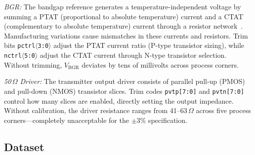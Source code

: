 \documentclass[lettersize,journal]{IEEEtran}
\begin{document}
\textit{BGR:} The bandgap reference generates a temperature-independent voltage by summing a PTAT (proportional to absolute temperature) current and a CTAT (complementary to absolute temperature) current through a resistor network~\cite{bgr_leung}. Manufacturing variations cause mismatches in these currents and resistors. Trim bits \texttt{pctrl$\langle$3:0$\rangle$} adjust the PTAT current ratio (P-type transistor sizing), while \texttt{nctrl$\langle$5:0$\rangle$} adjust the CTAT current through N-type transistor selection. Without trimming, $V_{\text{BGR}}$ deviates by tens of millivolts across process corners.


\textit{50\,$\Omega$ Driver:} The transmitter output driver consists of parallel pull-up (PMOS) and pull-down (NMOS) transistor slices. Trim codes \texttt{pvtp[7:0]} and \texttt{pvtn[7:0]} control how many slices are enabled, directly setting the output impedance. Without calibration, the driver resistance ranges from 41--63\,$\Omega$ across five process corners---completely unacceptable for the $\pm$3\% specification.


\subsection{Dataset}
\end{document}
